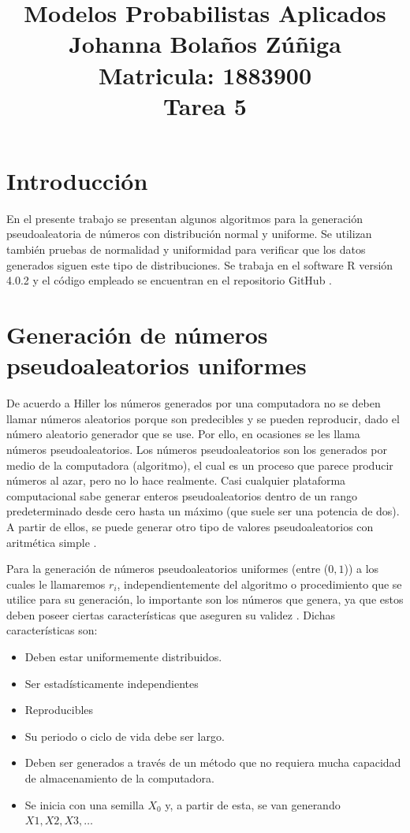 \documentclass{article}
\title{
\centering
Modelos Probabilistas Aplicados \\
Johanna Bolaños Zúñiga \\
Matricula: 1883900\\
Tarea 5
}
\date{}
\begin{document}
\maketitle

\section{Introducción}
En el presente trabajo se presentan algunos algoritmos para la generación pseudoaleatoria de números con distribución normal y uniforme. Se utilizan también pruebas de normalidad y uniformidad para verificar que los datos generados siguen este tipo de distribuciones. Se trabaja en el software R versión 4.0.2 \cite{r} y el código empleado se encuentran en el repositorio GitHub \cite{github}.

\section{Generación de números pseudoaleatorios uniformes} \label{distuniforme}
De acuerdo a Hiller \cite{hiller} los números generados por una computadora no se deben llamar números aleatorios porque son predecibles y se pueden reproducir, dado el número aleatorio generador que se use. Por ello, en ocasiones se les llama números pseudoaleatorios. Los números pseudoaleatorios son los generados por medio de la computadora (algoritmo), el cual es un proceso que parece producir números al azar, pero no lo hace realmente. Casi cualquier plataforma computacional sabe generar enteros pseudoaleatorios dentro de un rango predeterminado desde cero hasta un máximo (que suele ser una potencia de dos). A partir de ellos, se puede generar otro tipo de valores pseudoaleatorios con aritmética simple \cite{notasElisa}. 

Para la generación de números pseudoaleatorios uniformes (entre ($0, 1$)) a los cuales le llamaremos $r_{i}$, independientemente del algoritmo o procedimiento que se utilice para su generación, lo importante son los números que genera, ya que estos deben poseer ciertas características que aseguren su validez \cite{coss}. Dichas características son:

\begin{itemize}
    \item Deben estar uniformemente distribuidos.
    \item Ser estadísticamente independientes
    \item Reproducibles
    \item Su periodo o ciclo de vida debe ser largo.
    \item Deben ser generados a través de un método que no requiera mucha capacidad de almacenamiento de la computadora.
    \item Se inicia con una semilla $X_0$ y, a partir de esta, se van generando $X1, X2, X3, \dots$
\end{itemize}
\end{document}
